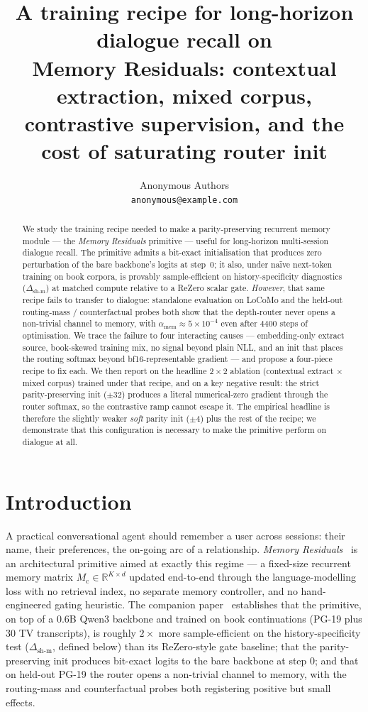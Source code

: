 \documentclass{article}
\title{A training recipe for long-horizon dialogue recall on\\
       Memory Residuals: contextual extraction, mixed corpus,\\
       contrastive supervision, and the cost of saturating router init}
\author{%
  Anonymous Authors\\
  \texttt{anonymous@example.com}%
}
\newcommand{\Mc}{M_{\text{c}}}
\newcommand{\dsh}{\Delta_{\text{sh-m}}}
\newcommand{\amem}{\alpha_{\text{mem}}}
\begin{document}
\maketitle

\begin{abstract}
We study the training recipe needed to make a parity-preserving
recurrent memory module --- the \emph{Memory Residuals} primitive ---
useful for long-horizon multi-session dialogue recall. The primitive
admits a bit-exact initialisation that produces zero perturbation of
the bare backbone's logits at step~$0$; it also, under na\"ive
next-token training on book corpora, is provably sample-efficient
on history-specificity diagnostics ($\dsh$) at matched compute
relative to a ReZero scalar gate. \emph{However}, that same recipe
fails to transfer to dialogue: standalone evaluation on LoCoMo and
the held-out routing-mass / counterfactual probes both show that the
depth-router never opens a non-trivial channel to memory, with
$\amem \approx 5\!\times\!10^{-4}$ even after $4400$ steps of
optimisation. We trace the failure to four interacting causes ---
embedding-only extract source, book-skewed training mix,
no signal beyond plain NLL, and an init that places the routing
softmax beyond bf16-representable gradient --- and propose a
four-piece recipe to fix each. We then report on the headline
$2\!\times\!2$ ablation (contextual extract $\times$ mixed corpus)
trained under that recipe, and on a key negative result: the strict
parity-preserving init ($\pm 32$) produces a literal numerical-zero
gradient through the router softmax, so the contrastive ramp cannot
escape it. The empirical headline is therefore the slightly weaker
\emph{soft} parity init ($\pm 4$) plus the rest of the recipe; we
demonstrate that this configuration is necessary to make the
primitive perform on dialogue at all.
\end{abstract}

\section{Introduction}
\label{sec:intro}

A practical conversational agent should remember a user across
sessions: their name, their preferences, the on-going arc of a
relationship. \emph{Memory Residuals}~\cite{liu2025memres,
duan2025memres} is an architectural primitive aimed at exactly
this regime --- a fixed-size recurrent memory matrix
$\Mc \in \mathbb{R}^{K\times d}$ updated end-to-end through the
language-modelling loss with no retrieval index, no separate memory
controller, and no hand-engineered gating heuristic. The companion
paper~\cite{liu2025drop} establishes that the primitive, on top of a
$0.6$B Qwen3 backbone and trained on book continuations (PG-19 plus
$30$ TV transcripts), is roughly $2\times$ more sample-efficient on
the history-specificity test ($\dsh$, defined below) than its
ReZero-style gate baseline; that the parity-preserving init produces
bit-exact logits to the bare backbone at step $0$; and that on
held-out PG-19 the router opens a non-trivial channel to memory,
with the routing-mass and counterfactual probes both registering
positive but small effects.
\end{document}
